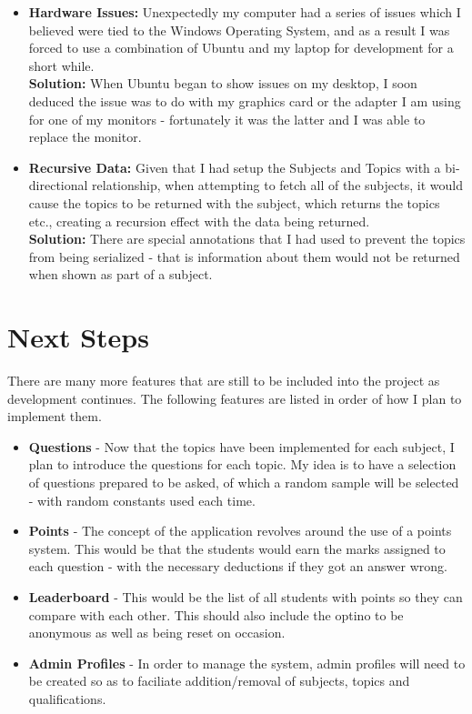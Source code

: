 \documentclass[]{final_report}
\begin{document}
\begin{itemize}
	\item \textbf{Hardware Issues:} Unexpectedly my computer had a series of issues which I believed were tied to the Windows Operating System, and as a result I was forced to use a combination of Ubuntu and my laptop for development for a short while. \\ \textbf{Solution:} When Ubuntu began to show issues on my desktop, I soon deduced the issue was to do with my graphics card or the adapter I am using for one of my monitors - fortunately it was the latter and I was able to replace the monitor. 
	
	\item \textbf{Recursive Data:} Given that I had setup the Subjects and Topics with a bi-directional relationship, when attempting to fetch all of the subjects, it would cause the topics to be returned with the subject, which returns the topics etc., creating a recursion effect with the data being returned.\\\textbf{Solution:} There are special annotations that I had used to prevent the topics from being serialized - that is information about them would not be returned when shown as part of a subject.
	
\end{itemize}

\section{Next Steps}

There are many more features that are still to be included into the project as development continues. The following features are listed in order of how I plan to implement them.

\begin{itemize}
	\item \textbf{Questions} - Now that the topics have been implemented for each subject, I plan to introduce the questions for each topic. My idea is to have a selection of questions prepared to be asked, of which a random sample will be selected - with random constants used each time.
	\item \textbf{Points} - The concept of the application revolves around the use of a points system. This would be that the students would earn the marks assigned to each question - with the necessary deductions if they got an answer wrong.
	\item \textbf{Leaderboard} - This would be the list of all students with points so they can compare with each other. This should also include the optino to be anonymous as well as being reset on occasion.
	\item \textbf{Admin Profiles} - In order to manage the system, admin profiles will need to be created so as to faciliate addition/removal of subjects, topics and qualifications.
\end{itemize}
\end{document}

